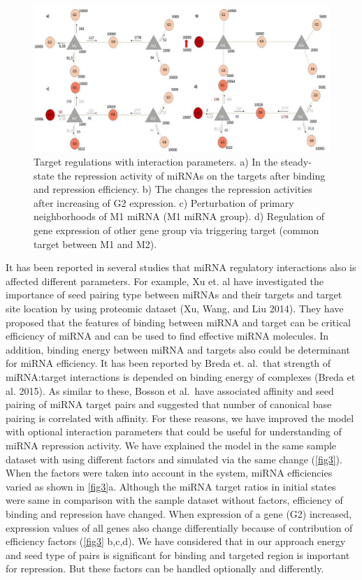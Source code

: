 \documentclass[]{article}
\begin{document}
\begin{figure}
\hypertarget{fig3}{%
\centering
\includegraphics{Fig3.jpg}
\caption{Target regulations with interaction parameters. a) In the
steady-state the repression activity of miRNAs on the targets after
binding and repression efficiency. b) The changes the repression
activities after increasing of G2 expression. c) Perturbation of primary
neighborhoods of M1 miRNA (M1 miRNA group). d) Regulation of gene
expression of other gene group via triggering target (common target
between M1 and M2).}\label{fig3}
}
\end{figure}

It has been reported in several studies that miRNA regulatory
interactions also is affected different parameters. For example, Xu et.
al have investigated the importance of seed pairing type between miRNAs
and their targets and target site location by using proteomic dataset
(Xu, Wang, and Liu 2014). They have proposed that the features of
binding between miRNA and target can be critical efficiency of miRNA and
can be used to find effective miRNA molecules. In addition, binding
energy between miRNA and targets also could be determinant for miRNA
efficiency. It has been reported by Breda et. al.~that strength of
miRNA:target interactions is depended on binding energy of complexes
(Breda et al. 2015). As similar to these, Bosson et al.~have associated
affinity and seed pairing of miRNA target pairs and suggested that
number of canonical base pairing is correlated with affinity. For these
reasons, we have improved the model with optional interaction parameters
that could be useful for understanding of miRNA repression activity. We
have explained the model in the same sample dataset with using different
factors and simulated via the same change (\autoref{fig3}). When the
factors were taken into account in the system, miRNA efficiencies varied
as shown in \autoref{fig3}a. Although the miRNA target ratios in initial
states were same in comparison with the sample dataset without factors,
efficiency of binding and repression have changed. When expression of a
gene (G2) increased, expression values of all genes also change
differentially because of contribution of efficiency factors
(\autoref{fig3} b,c,d). We have considered that in our approach energy
and seed type of pairs is significant for binding and targeted region is
important for repression. But these factors can be handled optionally
and differently.
\end{document}
